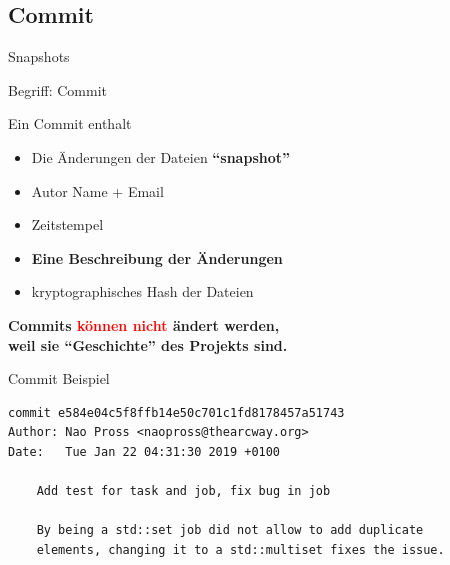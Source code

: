 \subsection{Commit}
\begin{frame}{Snapshots}
    \begin{center}
    \end{center}
\end{frame}

\begin{frame}{Begriff: Commit}
    \begin{block}{Ein Commit enthalt}
    \begin{itemize}
        \item Die \"Anderungen der Dateien \textbf{``snapshot''} \pause
        \item Autor Name + Email \pause
        \item Zeitstempel \pause
        \item \textbf{Eine Beschreibung der \"Anderungen} \pause
        \item kryptographisches Hash der Dateien
    \end{itemize}
    \end{block}

    \pause
	\begin{center}
	\textbf{
		Commits \textcolor{red}{k\"onnen nicht} \"andert werden, \\
    	weil sie ``Geschichte'' des Projekts sind.
	}
    \end{center}
\end{frame}

\begin{frame}[fragile]{Commit Beispiel}
\centering\footnotesize
\begin{verbatim}
commit e584e04c5f8ffb14e50c701c1fd8178457a51743
Author: Nao Pross <naopross@thearcway.org>
Date:   Tue Jan 22 04:31:30 2019 +0100

    Add test for task and job, fix bug in job

    By being a std::set job did not allow to add duplicate
    elements, changing it to a std::multiset fixes the issue.
\end{verbatim}
\end{frame}

